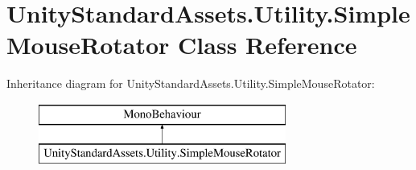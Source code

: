 \hypertarget{class_unity_standard_assets_1_1_utility_1_1_simple_mouse_rotator}{}\section{Unity\+Standard\+Assets.\+Utility.\+Simple\+Mouse\+Rotator Class Reference}
\label{class_unity_standard_assets_1_1_utility_1_1_simple_mouse_rotator}
Inheritance diagram for Unity\+Standard\+Assets.\+Utility.\+Simple\+Mouse\+Rotator\+:\begin{figure}[H]
\begin{center}
\leavevmode
\includegraphics[height=2.000000cm]{class_unity_standard_assets_1_1_utility_1_1_simple_mouse_rotator}
\end{center}
\end{figure}

